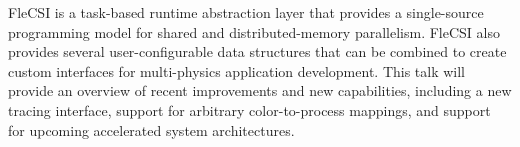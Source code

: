 FleCSI is a task-based runtime abstraction layer that provides a single-source programming model for shared and distributed-memory parallelism. FleCSI also provides several user-configurable data structures that can be combined to create custom interfaces for multi-physics application development. This talk will provide an overview of recent improvements and new capabilities, including a new tracing interface, support for arbitrary color-to-process mappings, and support for upcoming accelerated system architectures.